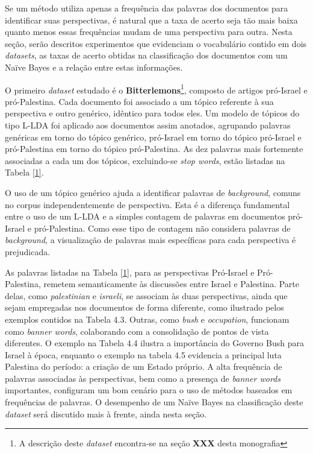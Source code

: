 Se um método utiliza apenas a frequência das palavras dos documentos para identificar suas perspectivas, é natural que a taxa de acerto seja tão mais baixa quanto menos essas frequências mudam de uma perspectiva para outra. Nesta seção, serão descritos experimentos que evidenciam o vocabulário contido em dois \emph{datasets}, as taxas de acerto obtidas na classificação dos documentos com um Naïve Bayes e a relação entre estas informações.

O primeiro \emph{dataset} estudado é o \textbf{Bitterlemons}\footnote{A descrição deste \emph{dataset} encontra-se na seção \textbf{XXX} desta monografia}, composto de artigos pró-Israel e pró-Palestina. Cada documento foi associado a um tópico referente à sua perspectiva e outro genérico, idêntico para todos eles. Um modelo de tópicos do tipo L-LDA foi aplicado aos documentos assim anotados, agrupando palavras genéricas em torno do tópico genérico, pró-Israel em torno do tópico pró-Israel e pró-Palestina em torno do tópico pró-Palestina. As dez palavras mais fortemente associadas a cada um dos tópicos, excluindo-se \emph{stop words}, estão listadas na Tabela \ref{1}.

O uso de um tópico genérico ajuda a identificar palavras de \emph{background}, comuns no corpus independentemente de perspectiva. Esta é a diferença fundamental entre o uso de um L-LDA e a simples contagem de palavras em documentos pró-Israel e pró-Palestina. Como esse tipo de contagem não considera palavras de \emph{background}, a visualização de palavras mais específicas para cada perspectiva é prejudicada.

As palavras listadas na Tabela \ref{1}, para as perspectivas Pró-Israel e Pró-Palestina, remetem semanticamente às discussões entre Israel e Palestina. Parte delas, como \emph{palestinian} e \emph{israeli}, se associam às duas perspectivas, ainda que sejam empregadas nos documentos de forma diferente, como ilustrado pelos exemplos contidos na Tabela 4.3. Outras, como \emph{bush} e \emph{occupation}, funcionam como \emph{banner words}, colaborando com a consolidação de pontos de vista diferentes. O exemplo na Tabela 4.4 ilustra a importância do Governo Bush para Israel à época, enquanto o exemplo na tabela 4.5 evidencia a principal luta Palestina do período: a criação de um Estado próprio. A alta frequência de palavras associadas às perspectivas, bem como a presença de \emph{banner words} importantes, configuram um bom cenário para o uso de métodos baseados em frequências de palavras. O desempenho de um Naïve Bayes na classificação deste \emph{dataset} será discutido mais à frente, ainda nesta seção.

